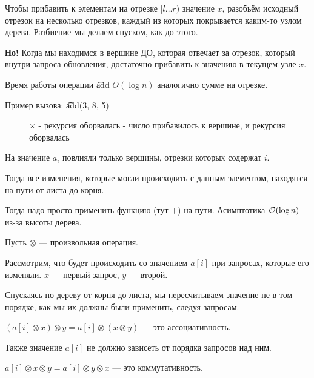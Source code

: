 Чтобы прибавить к элементам на отрезке $[l \ldots r)$ значение $x$, разобьём исходный отрезок на несколько отрезков, каждый из которых покрывается каким-то узлом дерева. Разбиение мы делаем спуском, как до этого.

{\bf Но!} Когда мы находимся в вершине ДО, которая отвечает за отрезок, который внутри запроса обновления, достаточно прибавить к значению в текущем узле $x$.

Время работы операции \t{add} $O(\log n)$ аналогично сумме на отрезке.
\down

Пример вызова: \t{add(3, 8, 5)}
\up \up
\begin{center}
	\begin{figure}[h]
		\captionsetup{font=small, labelformat=empty}
		\caption{$\times$ - рекурсия оборвалась \checkmark - число прибавилось к вершине, и рекурсия оборвалась}
		\label{fig:image}
	\end{figure}
\end{center}


На значение $a_i$ повлияли только вершины, отрезки которых содержат $i$.

Тогда все изменения, которые могли происходить с данным элементом, находятся на пути от листа до корня. 

Тогда надо просто применить функцию (тут $+$) на пути. Асимптотика $\mathcal{O}(\log n)$ из-за высоты дерева.


Пусть $\otimes$ --- произвольная операция.

Рассмотрим, что будет происходить со значением $a[i]$ при запросах, которые его изменяли. $x$ --- первый запрос, $y$ --- второй.
\down

Спускаясь по дереву от корня до листа, мы пересчитываем значение не в том порядке, как мы их должны были применить, следуя запросам.

$(a[i] \otimes x) \otimes y = a[i] \otimes (x \otimes y)$ --- это ассоциативность.

Также значение $a[i]$ не должно зависеть от порядка запросов над ним.

$a[i] \otimes x \otimes y = a[i] \otimes y \otimes x$ --- это коммутативность.

